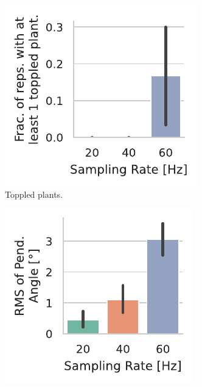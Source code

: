 \begin{figure}[t]
    \centering
    \begin{subfigure}[h]{.22\textwidth}
        \centering
        \includegraphics[width=\textwidth]{publications/2022CLEAVE/plots/fixed_video_topple_frac}
        \caption{Toppled plants.}\label{fig:video:toppled}
    \end{subfigure}%
    \hfill%
    \begin{subfigure}[h]{.22\textwidth}
        \centering
        \includegraphics[width=\textwidth]{publications/2022CLEAVE/plots/fixed_video_angle_rms}

\end{subfigure}
\end{figure}
